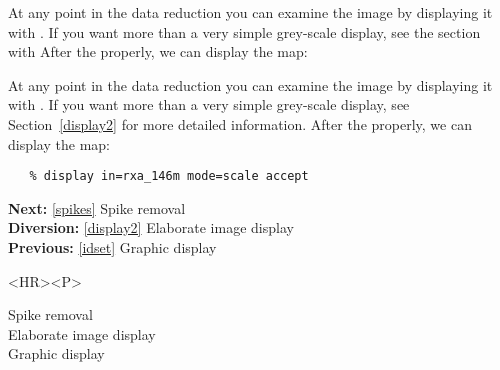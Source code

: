\begin{htmlonly}
   At any point in the data reduction you can examine the image
   by displaying it with
{\tt {}}.
   If you want more than a very simple grey-scale
   display, see the section with
   After the
   properly, we can display the map:
\end{htmlonly}
\begin{latexonly}
   At any point in the data reduction you can examine the image
   by displaying it with
{\tt {}}.
   If you want more than a very simple grey-scale
   display, see
Section~\ref{display2}
   for more detailed information.
   After the
   properly, we can display the map:
\end{latexonly}

\begin{verbatim}
   % display in=rxa_146m mode=scale accept
\end{verbatim}

\begin{latexonly}
\begin{center}
\leavevmode\epsfysize=80mm
\end{center}
\end{latexonly}

\begin{latexonly}
{\bf Next:} \ref{spikes} Spike removal\\
{\bf Diversion:} \ref{display2} Elaborate image display\\
{\bf Previous:} \ref{idset} Graphic display\\
\end{latexonly}

\begin{htmlonly}
\begin{rawhtml} <HR><P> \end{rawhtml}
{\bf {}} Spike removal\\
{\bf {}} Elaborate image display\\
{\bf {}} Graphic display\\
{\bf {}}\\
{\bf {}}\\
\end{htmlonly}


